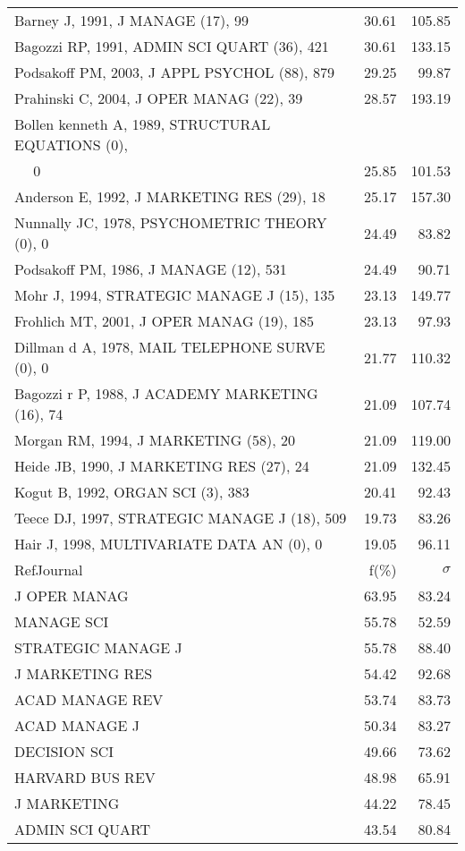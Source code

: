 \documentclass[a4paper,11pt]{report}
\begin{document}
\begin{landscape}
\begin{table}[!ht]
{\begin{tabular}{|l r r|}
Barney J, 1991, J MANAGE (17), 99 & 30.61 & 105.85\\
Bagozzi RP, 1991, ADMIN SCI QUART (36), 421 & 30.61 & 133.15\\
Podsakoff PM, 2003, J APPL PSYCHOL (88), 879 & 29.25 & 99.87\\
Prahinski C, 2004, J OPER MANAG (22), 39 & 28.57 & 193.19\\
Bollen kenneth A, 1989, STRUCTURAL EQUATIONS (0), &  & \\
$\quad$ 0 & 25.85 & 101.53\\
Anderson E, 1992, J MARKETING RES (29), 18 & 25.17 & 157.30\\
Nunnally JC, 1978, PSYCHOMETRIC THEORY (0), 0 & 24.49 & 83.82\\
Podsakoff PM, 1986, J MANAGE (12), 531 & 24.49 & 90.71\\
Mohr J, 1994, STRATEGIC MANAGE J (15), 135 & 23.13 & 149.77\\
Frohlich MT, 2001, J OPER MANAG (19), 185 & 23.13 & 97.93\\
Dillman d A, 1978, MAIL TELEPHONE SURVE (0), 0 & 21.77 & 110.32\\
Bagozzi r P, 1988, J ACADEMY MARKETING (16), 74 & 21.09 & 107.74\\
Morgan RM, 1994, J MARKETING (58), 20 & 21.09 & 119.00\\
Heide JB, 1990, J MARKETING RES (27), 24 & 21.09 & 132.45\\
Kogut B, 1992, ORGAN SCI (3), 383 & 20.41 & 92.43\\
Teece DJ, 1997, STRATEGIC MANAGE J (18), 509 & 19.73 & 83.26\\
Hair J, 1998, MULTIVARIATE DATA AN (0), 0 & 19.05 & 96.11\\
\hline
\hline
RefJournal & f(\%) & $\sigma$\\
\hline
J OPER MANAG & 63.95 & 83.24\\
MANAGE SCI & 55.78 & 52.59\\
STRATEGIC MANAGE J & 55.78 & 88.40\\
J MARKETING RES & 54.42 & 92.68\\
ACAD MANAGE REV & 53.74 & 83.73\\
ACAD MANAGE J & 50.34 & 83.27\\
DECISION SCI & 49.66 & 73.62\\
HARVARD BUS REV & 48.98 & 65.91\\
J MARKETING & 44.22 & 78.45\\
ADMIN SCI QUART & 43.54 & 80.84\\
\hline
\end{tabular}
}
\end{table}


\end{landscape}
\end{document}
